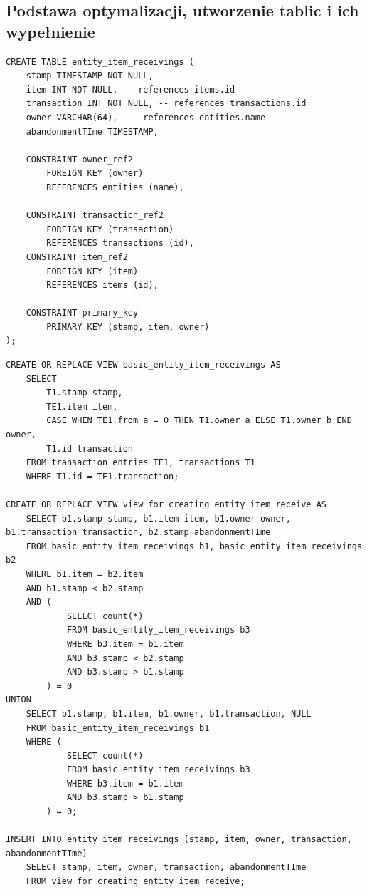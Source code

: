 \documentclass[11pt]{article}
\numberwithin{figure}{subsection}
\begin{document}
	\subsection{Podstawa optymalizacji, utworzenie tablic i ich wypełnienie}
		\begin{lstlisting}[caption={Tablica łącząca entity, przedmiot, oraz
		punkt w czasie początku i końca posiadania przedmiotu przez entity},
		captionpos=b]
CREATE TABLE entity_item_receivings (
	stamp TIMESTAMP NOT NULL,
	item INT NOT NULL, -- references items.id
	transaction INT NOT NULL, -- references transactions.id
	owner VARCHAR(64), --- references entities.name
	abandonmentTIme TIMESTAMP,
	
	CONSTRAINT owner_ref2
		FOREIGN KEY (owner)
		REFERENCES entities (name),
	
	CONSTRAINT transaction_ref2
		FOREIGN KEY (transaction)
		REFERENCES transactions (id),
	CONSTRAINT item_ref2
		FOREIGN KEY (item)
		REFERENCES items (id),
		
	CONSTRAINT primary_key
		PRIMARY KEY (stamp, item, owner)
);
		\end{lstlisting}
		
		\begin{lstlisting}[caption={Wypełnienie tablicy
		entity\_item\_receivings},captionpos=b]
CREATE OR REPLACE VIEW basic_entity_item_receivings AS 
	SELECT
		T1.stamp stamp,
		TE1.item item, 
		CASE WHEN TE1.from_a = 0 THEN T1.owner_a ELSE T1.owner_b END owner,
		T1.id transaction
	FROM transaction_entries TE1, transactions T1
	WHERE T1.id = TE1.transaction;

CREATE OR REPLACE VIEW view_for_creating_entity_item_receive AS
	SELECT b1.stamp stamp, b1.item item, b1.owner owner, b1.transaction transaction, b2.stamp abandonmentTIme
	FROM basic_entity_item_receivings b1, basic_entity_item_receivings b2
	WHERE b1.item = b2.item
	AND b1.stamp < b2.stamp
	AND (
			SELECT count(*)
			FROM basic_entity_item_receivings b3
			WHERE b3.item = b1.item
			AND b3.stamp < b2.stamp
			AND b3.stamp > b1.stamp
		) = 0
UNION
	SELECT b1.stamp, b1.item, b1.owner, b1.transaction, NULL
	FROM basic_entity_item_receivings b1
	WHERE (
			SELECT count(*)
			FROM basic_entity_item_receivings b3
			WHERE b3.item = b1.item
			AND b3.stamp > b1.stamp
		) = 0;
	
INSERT INTO entity_item_receivings (stamp, item, owner, transaction, abandonmentTIme)
	SELECT stamp, item, owner, transaction, abandonmentTIme
	FROM view_for_creating_entity_item_receive;
		\end{lstlisting}
		
\end{document}
